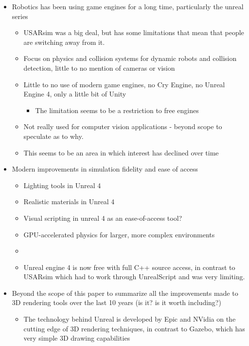 \begin{itemize}
\item Robotics has been using game engines for a long time, particularly the unreal series
	\begin{itemize}
	\item USARsim was a big deal, but has some limitations that mean that people are switching away from it.
	\item Focus on physics and collision systems for dynamic robots and collision detection, little to no mention of cameras or vision
	\item Little to no use of modern game engines, no Cry Engine, no Unreal Engine 4, only a little bit of Unity
	\begin{itemize}
	    \item The limitation seems to be a restriction to free engines
	\end{itemize}
	\item Not really used for computer vision applications - beyond scope to speculate as to why.
	\item This seems to be an area in which interest has declined over time
	\end{itemize}

\item Modern improvements in simulation fidelity and ease of access
	\begin{itemize}
	\item Lighting tools in Unreal 4 \cite{karis2013real}
	\item Realistic materials in Unreal 4 \cite{karis2013real}
	\item Visual scripting in unreal 4 as an ease-of-access tool?
	\item GPU-accelerated physics for larger, more complex environments
	\item 
	\item Unreal engine 4 is now free with full C++ source access, in contrast to USARsim which had to work through UnrealScript and was very limiting.
	\end{itemize}
\item Beyond the scope of this paper to summarize all the improvements made to 3D rendering tools over the last 10 years (is it? is it worth including?)
	\begin{itemize}
	\item The technology behind Unreal is developed by Epic and NVidia on the cutting edge of 3D rendering techniques, in contrast to Gazebo, which has very simple 3D drawing capabilities
	\end{itemize}
\end{itemize}

